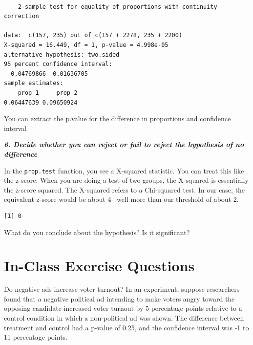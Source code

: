 \documentclass[
  letterpaper,
  DIV=11,
  numbers=noendperiod]{scrreprt}
\newenvironment{Shaded}{\begin{snugshade}}{\end{snugshade}}
\newcommand{\AttributeTok}[1]{\textcolor[rgb]{0.40,0.45,0.13}{#1}}
\newcommand{\DecValTok}[1]{\textcolor[rgb]{0.68,0.00,0.00}{#1}}
\newcommand{\FunctionTok}[1]{\textcolor[rgb]{0.28,0.35,0.67}{#1}}
\newcommand{\NormalTok}[1]{\textcolor[rgb]{0.00,0.23,0.31}{#1}}
\newcommand{\SpecialCharTok}[1]{\textcolor[rgb]{0.37,0.37,0.37}{#1}}
\begin{document}
\begin{verbatim}

    2-sample test for equality of proportions with continuity correction

data:  c(157, 235) out of c(157 + 2278, 235 + 2200)
X-squared = 16.449, df = 1, p-value = 4.998e-05
alternative hypothesis: two.sided
95 percent confidence interval:
 -0.04769866 -0.01636705
sample estimates:
    prop 1     prop 2 
0.06447639 0.09650924 
\end{verbatim}

You can extract the p.value for the difference in proportions and
confidence interval

\textbf{\emph{6. Decide whether you can reject or fail to reject the
hypothesis of no difference}}

In the \texttt{prop.test} function, you see a X-squared statistic. You
can treat this like the z-score. When you are doing a test of two
groups, the X-squared is essentially the z-score squared. The X-squared
refers to a Chi-squared test. In our case, the equivalent z-score would
be about 4-- well more than our threshold of about 2.

\begin{Shaded}
\end{Shaded}

\begin{verbatim}
[1] 0
\end{verbatim}

What do you conclude about the hypothesis? Is it significant?

\hypertarget{in-class-exercise-questions}{%
\section{In-Class Exercise
Questions}\label{in-class-exercise-questions}}

Do negative ads increase voter turnout? In an experiment, suppose
researchers found that a negative political ad intending to make voters
angry toward the opposing candidate increased voter turnout by 5
percentage points relative to a control condition in which a
non-political ad was shown. The difference between treatment and control
had a p-value of 0.25, and the confidence interval was -1 to 11
percentage points.
\end{document}
